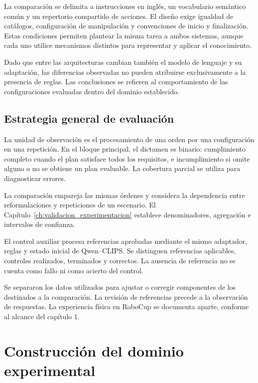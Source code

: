 La comparación se delimita a instrucciones en inglés, un vocabulario
semántico común y un repertorio compartido de acciones. El diseño exige
igualdad de catálogos, configuración de manipulación y convenciones de
inicio y finalización. Estas condiciones permiten plantear la misma tarea
a ambos sistemas, aunque cada uno utilice mecanismos distintos para
representar y aplicar el conocimiento.

Dado que entre las arquitecturas cambian también el modelo de lenguaje y
su adaptación, las diferencias observadas no pueden atribuirse
exclusivamente a la presencia de reglas. Las conclusiones se refieren al
comportamiento de las configuraciones evaluadas dentro del dominio
establecido.

\subsection{Estrategia general de evaluación}
\label{subsec:estrategia_evaluacion_cap4}

La unidad de observación es el procesamiento de una orden por una configuración en una repetición. En el bloque principal, el dictamen es binario: cumplimiento completo cuando el plan satisface todos los requisitos, e incumplimiento si omite alguno o no se obtiene un plan evaluable. La cobertura parcial se utiliza para diagnosticar errores.

La comparación empareja las mismas órdenes y considera la dependencia entre reformulaciones y repeticiones de un escenario. El Capítulo~\ref{ch:validacion_experimentacion} establece denominadores, agregación e intervalos de confianza.

El control auxiliar procesa referencias aprobadas mediante el mismo adaptador, reglas y estado inicial de Qwen--CLIPS. Se distinguen referencias aplicables, controles realizados, terminados y correctos. La ausencia de referencia no se cuenta como fallo ni como acierto del control.

Se separaron los datos utilizados para ajustar o corregir componentes de los destinados a la comparación. La revisión de referencias precede a la observación de respuestas. La experiencia física en RoboCup se documenta aparte, conforme al alcance del capítulo 1.

\section{Construcción del dominio experimental}
\label{sec:construccion_dominio}

